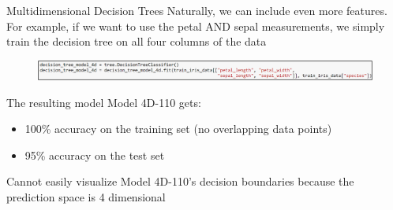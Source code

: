 \documentclass[aspectratio=169]{../latex_main/tntbeamer}  %
\begin{document}
	
	\begin{frame}{Multidimensional Decision Trees}
	  Naturally, we can include even more features. For example, if we want to use the petal AND sepal measurements, we simply train the decision tree on all four columns of the data\\
	  \begin{figure}
	        \centering
	        \includegraphics[scale=.6]{Bild32}
	    \end{figure}
	    The resulting model Model 4D-110 gets:
	    \begin{itemize}
	        \item 100\% accuracy on the training set (no overlapping data points)
            \item 95\% accuracy on the test set
	    \end{itemize}
	    Cannot easily visualize Model 4D-110’s decision   boundaries because the prediction space   is 4 dimensional
	\end{frame}
	
\end{document}
